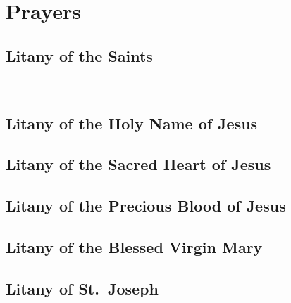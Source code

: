 \def\tabmark{Prayers}

\chapter[Prayers][Prayers]{Prayers}

\setlength{\multicolsep}{1pt}

\section{Litany of the Saints}



\bigskip

~

\bigskip




\section{Litany of the Holy Name of Jesus}






\section{Litany of the Sacred Heart of Jesus}
\label{lit-SC}






\bigskip







\section{Litany of the Precious Blood of Jesus}



\section{Litany of the Blessed Virgin Mary}





\bigskip




\section{Litany of St.~Joseph}




